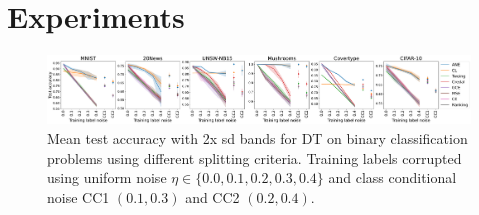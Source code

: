 \documentclass[letterpaper]{article} %
\newcommand{\bp}{{\bm{p}}}
\newcommand{\by}{{\bm{y}}}
\newcommand{\cS}{{\cal{S}}}
\newcommand{\cD}{{\cal{D}}}
\newcommand{\NE}{\mathrm{NE}}
\begin{document}




\section{Experiments}
\label{sec:experiments}

\begin{figure}[h!]
    \centering
    \includegraphics[width=0.97\linewidth]{figs/binary_classification,DT_classfier.pdf}
    \caption{
    Mean test accuracy with 2x sd bands for DT on binary classification problems using different splitting criteria.   
    Training labels corrupted using uniform noise $\eta\in\{0.0, 0.1,0.2,0.3,0.4\}$ and class conditional noise CC1 $(0.1,0.3)$ and CC2 $(0.2,0.4)$.
    }
    \label{fig:dt-bin}
\end{figure}
\end{document}
